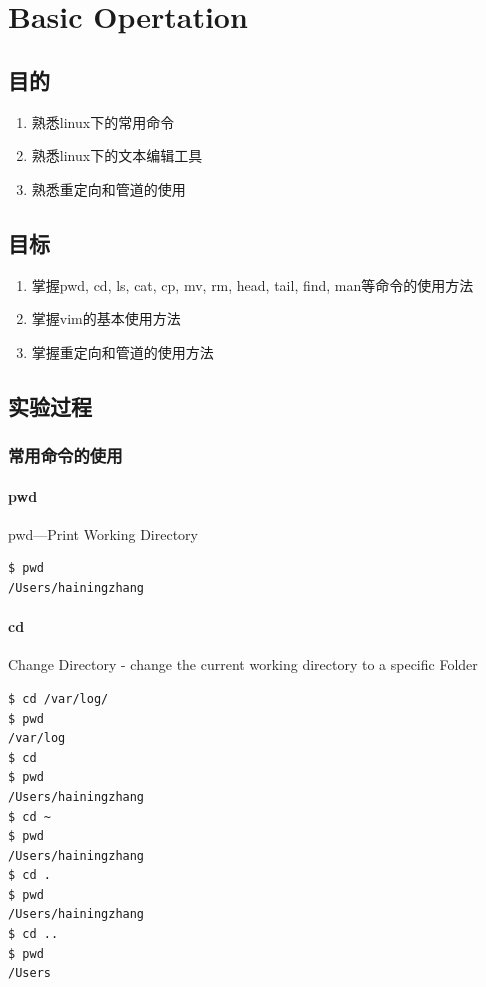 \chapter{Basic Opertation}
\section{目的}
\begin{enumerate}
\item
熟悉linux下的常用命令
\item
熟悉linux下的文本编辑工具
\item
熟悉重定向和管道的使用
\end{enumerate}
\section{目标}
\begin{enumerate}
\item
掌握pwd, cd, ls, cat, cp, mv, rm, head, tail, find, man等命令的使用方法
\item
掌握vim的基本使用方法
\item
掌握重定向和管道的使用方法
\end{enumerate}
\section{实验过程}
\subsection{常用命令的使用}

\subsubsection{pwd}
pwd---Print Working Directory
\begin{verbatim}
$ pwd
/Users/hainingzhang
\end{verbatim}

\subsubsection{cd}
Change Directory - change the current working directory to a specific Folder
\begin{verbatim}
$ cd /var/log/
$ pwd
/var/log
$ cd
$ pwd
/Users/hainingzhang
$ cd ~
$ pwd
/Users/hainingzhang
$ cd .
$ pwd
/Users/hainingzhang
$ cd ..
$ pwd
/Users
\end{verbatim}


